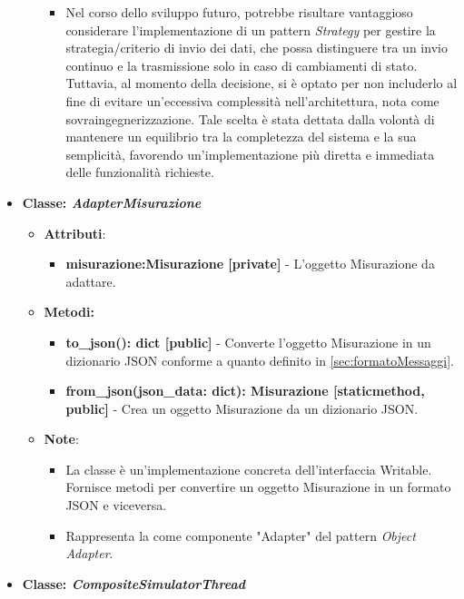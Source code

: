 \begin{itemize}
\begin{itemize}
\begin{itemize}
            \item Nel corso dello sviluppo futuro, potrebbe risultare vantaggioso considerare l'implementazione di un pattern \textit{Strategy} per gestire la strategia/criterio di invio dei dati, che possa distinguere tra un invio continuo e la trasmissione solo in caso di cambiamenti di stato. Tuttavia, al momento della decisione, si è optato per non includerlo al fine di evitare un'eccessiva complessità nell'architettura, nota come sovraingegnerizzazione. Tale scelta è stata dettata dalla volontà di mantenere un equilibrio tra la completezza del sistema e la sua semplicità, favorendo un'implementazione più diretta e immediata delle funzionalità richieste.
        \end{itemize}
    \end{itemize}
    \item{\textbf{Classe: \textit{AdapterMisurazione}}}
    \begin{itemize}
        \item\textbf{Attributi}:
        \begin{itemize}
            \item \textbf{misurazione:Misurazione [private]} - L'oggetto Misurazione da adattare.
        \end{itemize}
        \item \textbf{Metodi: }
        \begin{itemize}
            \item \textbf{to\_json(): dict [public]} - Converte l'oggetto Misurazione in un dizionario JSON conforme a quanto definito in \ref{sec:formatoMessaggi}.
            \item \textbf{from\_json(json\_data: dict): Misurazione [staticmethod, public]} - Crea un oggetto Misurazione da un dizionario JSON.
        \end{itemize}
        \item\textbf{Note}:
        \begin{itemize}
            \item La classe è un'implementazione concreta dell'interfaccia Writable. Fornisce metodi per convertire un oggetto Misurazione in un formato JSON e viceversa.
            \item Rappresenta la come componente "Adapter" del pattern \textit{Object Adapter}.
        \end{itemize}
    \end{itemize}
    \item{\textbf{Classe: \textit{CompositeSimulatorThread}}}

\end{itemize}
